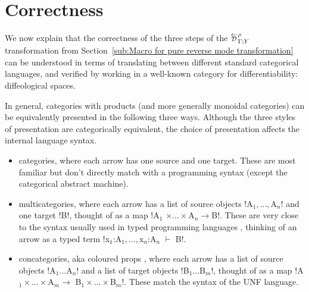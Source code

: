 \section{Correctness}
\label{sec:correctness}

We now explain that the correctness of the three steps of the $\directD{\rho}{\Gamma}{Y}$ transformation from Section~\ref{sub:Macro for pure reverse mode transformation} can be understood in terms of translating between different standard categorical languages, 
and verified by working in a well-known category for differentiability: diffeological spaces. 

In general, categories with products (and more generally monoidal categories) can be equivalently presented in the following three ways. 
Although the three styles of presentation are categorically equivalent, the choice of presentation affects the internal language syntax.
\begin{itemize}
    \item categories, where each arrow has one source and one target. These are most familiar but don’t directly match with a programming syntax (except the categorical abstract machine). 
    \item multicategories, where each arrow has a list of source objects !A$_1,\ldots,$A$_n$! and one target !B!, thought of as a map !A$_1$ $\times\ldots\times$A$_n\to$B!. 
    These are very close to the syntax usually used in typed programming languages \cite{lambek1968deductive,staton2013universal}, 
    thinking of an arrow as a typed term !x$_1$:A$_1,\ldots,$x$_n$:A$_n$ $\vdash$ B!.
    \item concategories, aka coloured props \cite{bonchi2015full,fong2019backprop}, where each arrow has a list of source objects !A$_1\ldots$A$_n$! and a list of target objects !B$_1\ldots$B$_m$!, thought of as a map !A$_1\times\ldots\times$A$_m \to$ B$_1\times\ldots\times$B$_m$!. These match the syntax of the UNF language.
\end{itemize}

